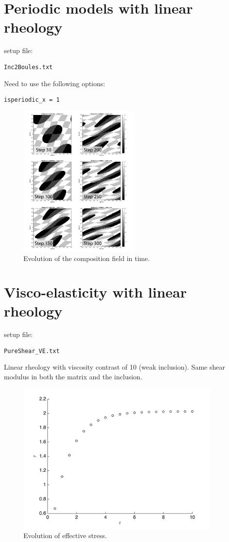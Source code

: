 \documentclass[12pt,english,openany]{scrbook}
\begin{document}
\section{Periodic models with linear rheology}

setup file:
\begin{verbatim} 
Inc2Boules.txt
\end{verbatim}

Need to use the following options:
\begin{verbatim} 
isperiodic_x = 1
\end{verbatim}

\begin{figure}[ht!]
\centerline{\includegraphics[height=3.0in]{./Figures/Periodic_Inc2Boules_MDOODZ}}
\caption{Evolution of the composition field in time.}
\label{Inc2Bouless}
\end{figure}

\section{Visco-elasticity with linear rheology}

setup file:
\begin{verbatim} 
PureShear_VE.txt
\end{verbatim}

Linear rheology with viscosity contrast of 10 (weak inclusion).
Same shear modulus in both the matrix and the inclusion.

\begin{figure}[ht!]
\centerline{\includegraphics[height=3.0in]{./Figures/PureShear_VE_evol}}
\caption{Evolution of effective stress.}
\label{PureShear_VE_evol}
\end{figure}
\end{document}
